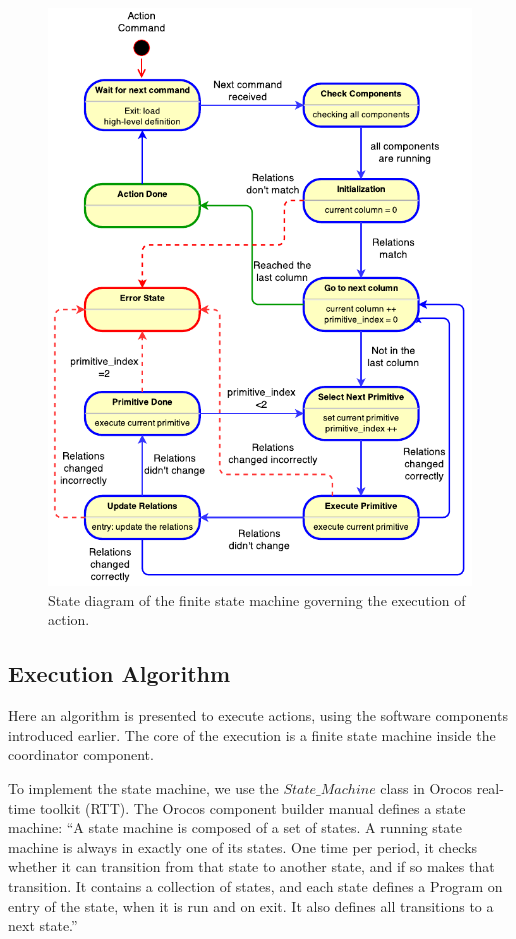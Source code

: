 \begin{figure}
      \centering
      \includegraphics[scale=1]{./pdf/coordinator_fsm.pdf}
      \caption{ State diagram of the finite state machine governing the execution of action.
}
      \label{fig:coordinator_fsm}
\end{figure}


\subsection{Execution Algorithm}
\label{sec:execution_algorithm}

Here an algorithm is presented to execute actions, using the software components introduced earlier.
The core of the execution is a finite state machine inside the coordinator component.

To implement the state machine, we use the $State\_Machine$ class in Orocos real-time toolkit (RTT).
The Orocos component builder manual defines a state machine:
``A state machine is composed of a set of states. A running state machine is always in exactly one of its states.
One time per period, it checks whether it can transition from that state to another state, and if so makes that transition.
It contains a collection of states, and each state defines a Program on entry of the state, when it is run and on exit.
It also defines all transitions to a next state.''

